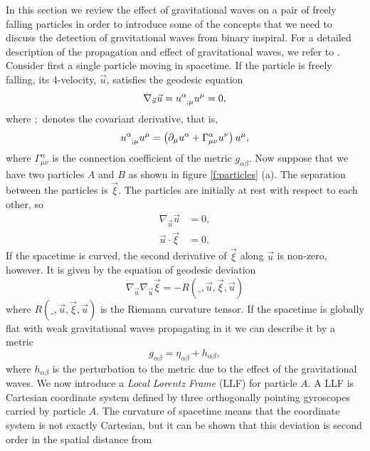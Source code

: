 In this section we review the effect of gravitational waves on a pair of
freely falling particles in order to introduce some of the concepts that we
need to discuss the detection of gravitational waves from binary inspiral.
For a detailed description of the propagation and effect of gravitational
waves, we refer to \cite{MTW73,Thorne:1982cv}. Consider first a single
particle moving in spacetime. If the particle is freely falling, its
4-velocity, $\vec{u}$, satisfies the geodesic equation
\begin{equation}
\label{eq:geodessic}
\nabla_{\vec{u}} \vec{u} = \tensor{u}{^\alpha_{;\mu}}u^{\mu} = 0,
\end{equation}
where $;$ denotes the covariant derivative, that is,
\begin{equation}
\tensor{u}{^\alpha_{;\mu}}\tensor{u}{^{\mu}} = \left(\partial_\mu\tensor{u}{^\alpha} +
\Gamma^\alpha_{\mu\nu}u^\nu\right) u^\mu,
\end{equation}
where $\Gamma^\alpha_{\mu\nu}$ is the connection coefficient of the metric
$g_{\alpha\beta}$. Now suppose that we have two particles $A$ and $B$ as shown
in figure \ref{f:particles} (a). The separation between the particles is
$\vec{\xi}$. The particles are initially at rest with respect to each other, so
\begin{align}
\nabla_{\vec{u}} \vec{u} &= 0, \\
\vec{u} \cdot \vec{\xi} & = 0.
\end{align}
If the spacetime is curved, the second derivative of $\vec{\xi}$ along
$\vec{u}$ is non-zero, however. It is given by the equation of geodesic
deviation
\begin{equation}
\nabla_{\vec{u}}\nabla_{\vec{u}} \vec{\xi} = - R(\_,\vec{u},\vec{\xi},\vec{u})
\end{equation}
where $R(\_,\vec{u},\vec{\xi},\vec{u})$ is the Riemann curvature tensor. 
If the spacetime is globally flat with weak gravitational waves propagating in
it we can describe it by a metric 
\begin{equation}
g_{\alpha\beta} = \eta_{\alpha\beta} + h_{\alpha\beta},
\end{equation}
where $h_{\alpha\beta}$ is the perturbation to the metric due to the effect of
the gravitational waves.  We now introduce a \emph{Local Lorentz Frame} (LLF)
for particle $A$. A LLF is Cartesian coordinate system defined by three
orthogonally pointing gyroscopes carried by particle $A$. The curvature of
spacetime means that the coordinate system is not exactly Cartesian, but it
can be shown that this deviation is second order in the spatial distance from
